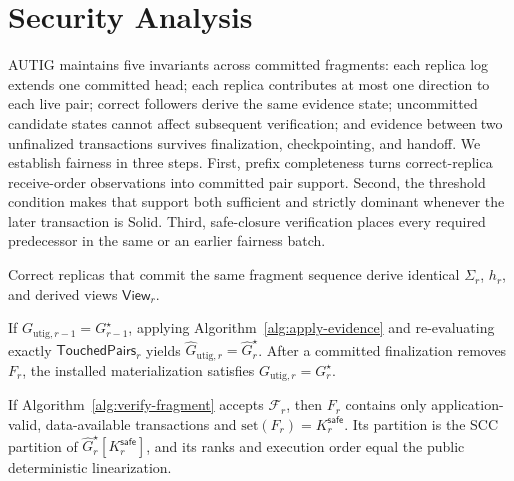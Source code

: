 \section{Security Analysis}
\label{sec:analysis}

AUTIG maintains five invariants across committed fragments: each replica log
extends one committed head; each replica contributes at most one direction to
each live pair; correct followers derive the same evidence state; uncommitted
candidate states cannot affect subsequent verification; and evidence between
two unfinalized transactions survives finalization, checkpointing, and
handoff.  We establish fairness in three steps.  First, prefix completeness
turns correct-replica receive-order observations into committed pair support.  Second,
the threshold condition makes that support both sufficient and strictly
dominant whenever the later transaction is Solid.  Third, safe-closure
verification places every required predecessor in the same or an earlier
fairness batch.

\begin{theorem}
\label{thm:state-agreement}
Correct replicas that commit the same fragment sequence derive identical
$\Sigma_r$, $h_r$, and derived views $\mathsf{View}_r$.
\end{theorem}

\begin{theorem}
\label{thm:incremental-equivalence}
If $G_{\mathrm{utig},r-1}=G_{r-1}^\star$, applying
Algorithm~\ref{alg:apply-evidence} and re-evaluating exactly
$\mathsf{TouchedPairs}_r$ yields
$\widehat G_{\mathrm{utig},r}=\widehat G_r^\star$.  After a committed
finalization removes $F_r$, the installed materialization satisfies
$G_{\mathrm{utig},r}=G_r^\star$.
\end{theorem}

\begin{theorem}
\label{thm:safe-fragment}
If Algorithm~\ref{alg:verify-fragment} accepts $\mathcal F_r$, then
$F_r$ contains only application-valid, data-available transactions and
$\mathrm{set}(F_r)=K_r^{\mathsf{safe}}$.  Its partition is the SCC partition
of $\widehat G_r^\star[K_r^{\mathsf{safe}}]$, and its ranks and execution
order equal the public deterministic linearization.
\end{theorem}

